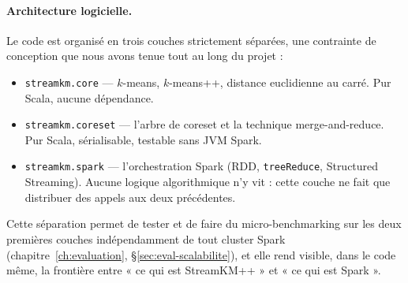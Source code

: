 \paragraph{Architecture logicielle.} Le code est organisé en trois couches
strictement séparées, une contrainte de conception que nous avons tenue tout
au long du projet :

\begin{itemize}
  \item \texttt{streamkm.core} --- $k$-means, $k$-means++, distance
    euclidienne au carré. Pur Scala, aucune dépendance.
  \item \texttt{streamkm.coreset} --- l'arbre de coreset et la technique
    merge-and-reduce. Pur Scala, sérialisable, testable sans JVM Spark.
  \item \texttt{streamkm.spark} --- l'orchestration Spark (RDD,
    \texttt{treeReduce}, Structured Streaming). Aucune logique
    algorithmique n'y vit : cette couche ne fait que distribuer des appels
    aux deux précédentes.
\end{itemize}

Cette séparation permet de tester et de faire du micro-benchmarking sur les
deux premières couches indépendamment de tout cluster Spark
(chapitre~\ref{ch:evaluation}, §\ref{sec:eval-scalabilite}), et elle rend
visible, dans le code même, la frontière entre « ce qui est StreamKM++ » et
« ce qui est Spark ».
